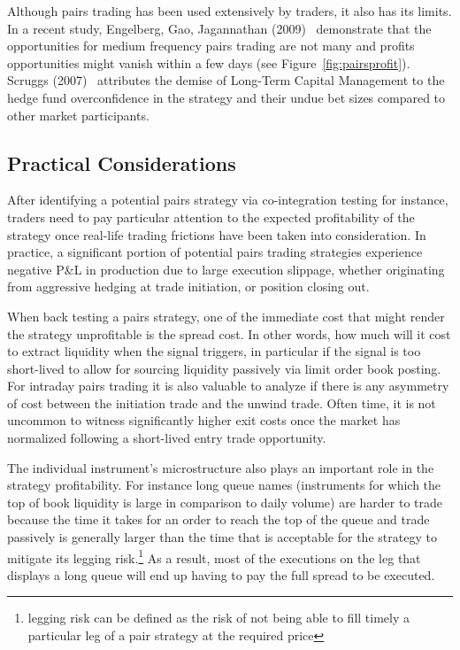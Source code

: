 Although pairs trading has been used extensively by traders, it also has its limits. In a recent study, Engelberg, Gao, Jagannathan (2009)~\cite{engelberg2009anatomy} demonstrate that the opportunities for medium frequency pairs trading are not many and profits opportunities might vanish within a few days (see Figure~\ref{fig:pairsprofit}). Scruggs (2007)~\cite{scruggs} attributes the demise of Long-Term Capital Management to the hedge fund overconfidence in the strategy and their undue bet sizes compared to other market participants.



\subsection{Practical Considerations}


After identifying a potential pairs strategy via co-integration testing for instance, traders need to pay particular attention to the expected profitability of the strategy once real-life trading frictions have been taken into consideration. In practice, a significant portion of potential pairs trading strategies experience negative P\&L in production due to large execution slippage, whether originating from aggressive hedging at trade initiation, or position closing out.


When back testing a pairs strategy, one of the immediate cost that might render the strategy unprofitable is the spread cost. In other words, how much will it cost to extract liquidity when the signal triggers, in particular if the signal is too short-lived to allow for sourcing liquidity passively via limit order book posting. For intraday pairs trading it is also valuable to analyze if there is any asymmetry of cost between the initiation trade and the unwind trade. Often time, it is not uncommon to witness significantly higher exit costs once the market has normalized following a short-lived entry trade opportunity. 


The individual instrument's microstructure also plays an important role in the strategy profitability. For instance long queue names  (instruments for which the top of book liquidity is large in comparison to daily volume)  are harder to trade because the time it takes for an order to reach the top of the queue and trade passively is generally larger than the time that is acceptable for the strategy to mitigate its legging risk.\footnote{legging risk can be defined as the risk of not being able to fill timely a particular leg of a pair strategy at the required price} As a result, most of the executions on the leg that displays a long queue will end up having to pay the full spread to be executed. 


